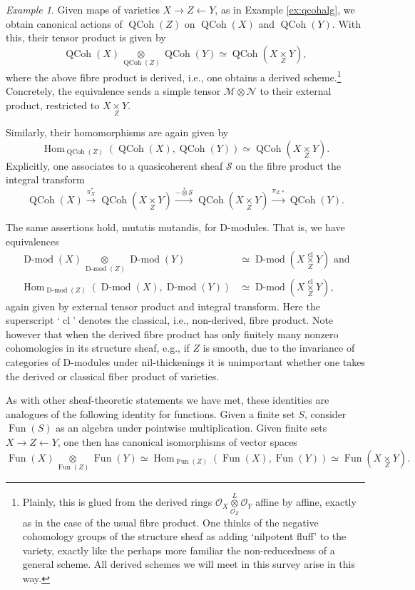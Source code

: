 \documentclass[10pt]{amsart}
\newcommand{\sM}{\mathscr{M}}
\newcommand{\on}{\operatorname}
\newcommand{\Dmod}{\on{D-mod}}
\newcommand{\Fun}{\on{Fun}}
\theoremstyle{remark}
\newtheorem{ex}[subsubsection]{Example}
\newcommand{\sS}{\mathscr{S}}
\newcommand{\Hom}{\operatorname{Hom}}
\newcommand{\sN}{\mathscr{N}}
\newcommand{\OO}{\mathscr{O}}
\numberwithin{equation}{section}
\newcommand{\QCoh}{\on{QCoh}}
\begin{document}
\begin{ex} \label{e:fibprodvar}Given maps of varieties $X \rightarrow Z 
\leftarrow Y$, as in 
Example \ref{ex:qcohalg}, we obtain canonical actions of $\QCoh(Z)$ on 
$\QCoh(X)$ and $\QCoh(Y)$. With this, their tensor product is given by
%
\[
    \QCoh(X) 
    \underset{\QCoh(Z)}{\otimes} \QCoh(Y) \simeq \QCoh( X \underset{Z}{\times} 
    Y),
\]
%	
where the above fibre product is derived, i.e., one obtains a 
derived scheme.\footnote{Plainly, this is glued from the derived rings $\OO_X 
\underset{\OO_Z}{\overset{L}{\otimes}} \OO_Y$ affine by affine, exactly as in 
the case of the usual fibre product. One thinks of the negative cohomology groups of the structure sheaf as adding `nilpotent fluff' to the variety, exactly like the perhaps more familiar the non-reducedness of a general scheme. All derived schemes we will meet in this survey arise in this way.} 
Concretely, the equivalence sends a simple tensor $\sM \otimes \sN$ to their 
external product, restricted to $X \underset{Z}{\times} Y$.  

Similarly, their homomorphisms are again given by 
%
\[
 \Hom_{\QCoh(Z)}(\QCoh(X), \QCoh(Y)) \simeq \QCoh( X \underset{Z}{\times} 
 Y).
\]
%
Explicitly, one associates to a quasicoherent sheaf $\sS$ on the fibre product 
the integral transform 
%
\[
  \QCoh(X) \xrightarrow{ \pi_X^*} \QCoh(X \underset Z \times Y) \xrightarrow{ - 
  \overset * \otimes \sS} \QCoh(X \underset Z \times Y) \xrightarrow{\pi_{Z, 
  *}} \QCoh(Y). 
\] 
%

The same assertions hold, mutatis mutandis, for D-modules. That is, we have 
equivalences 
%
\begin{align*}
  \Dmod(X) \underset{\Dmod(Z)}{\otimes} \Dmod(Y) &\simeq \Dmod(X \overset{\on{cl}}{{\underset Z {\times}}} Y) \text{ and}  \\ 
  \Hom_{\Dmod(Z)}(\Dmod(X), \Dmod(Y)) &\simeq \Dmod(X \overset{\on{cl}}{{\underset Z {\times}}} Y),
\end{align*}
%
again given by external tensor product and integral transform. Here the superscript `$\on{cl}$' denotes the classical, i.e., non-derived, fibre product. Note however that when the derived fibre product has only finitely many nonzero cohomologies in its structure sheaf, e.g., if $Z$ is smooth, due to the invariance of categories of D-modules under 
nil-thickenings it is 
unimportant whether one takes the derived or classical fiber product of 
varieties. 

As with other sheaf-theoretic statements we have met, these identities are 
analogues 
of the 
following identity for functions. Given a finite set $S$, consider $\Fun(S)$ as 
an algebra 
under 
pointwise multiplication. Given finite sets $X \rightarrow Z 
\leftarrow Y$, one then has canonical isomorphisms of vector spaces 
%
\[
    \Fun(X) \underset{\Fun(Z)}{\otimes} \Fun(Y) \simeq 
    \Hom_{\Fun(Z)}(\Fun(X), \Fun(Y)) \simeq \Fun(X \underset Z \times Y).
\]
%
\end{ex}
\end{document}
